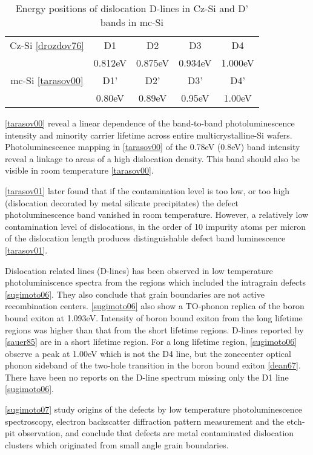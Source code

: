 \begin{table}[H]
\centering
\begin{tabular}{|c|c|c|c|c|}
\hline
Cz-Si \ref{drozdov76} & D1 & D2 & D3 & D4 \\
	& 0.812eV & 0.875eV & 0.934eV & 1.000eV \\
\hline
mc-Si \ref{tarasov00} & D1' & D2' & D3' & D4' \\
		& 0.80eV & 0.89eV & 0.95eV & 1.00eV \\
\hline
\end{tabular}
\caption{Energy positions of dislocation D-lines in Cz-Si and D' bands in mc-Si}
\label{}
\end{table}


\ref{tarasov00} reveal a linear dependence of the band-to-band photoluminescence intensity and minority carrier lifetime across entire multicrystalline-Si wafers. Photoluminescence mapping in \ref{tarasov00} of the 0.78eV (0.8eV) band intensity reveal a linkage to areas of a high dislocation density. This band should also be visible in room temperature \ref{tarasov00}.

\ref{tarasov01} later found that if the contamination level is too low, or too high (dislocation decorated by metal silicate precipitates) the defect photoluminescence band vanished in room temperature. However, a relatively low contamination level of dislocations, in the order of 10 impurity atoms per micron of the dislocation length produces distinguishable defect band luminescence \ref{tarasov01}. 

Dislocation related lines (D-lines) has been observed in low temperature photoluminiscence spectra from the regions which included the intragrain defects \ref{sugimoto06}. They also conclude that grain boundaries are not active recombination centers. \ref{sugimoto06} also show a TO-phonon replica of the boron bound exiton at 1.093eV. Intensity of boron bound exiton from the long lifetime regions was higher than that from the short lifetime regions. D-lines reported by \ref{sauer85} are in a short lifetime region. For a long lifetime region, \ref{sugimoto06} observe a peak at 1.00eV which is not the D4 line, but the zonecenter optical phonon sideband of the two-hole transition in the boron bound exiton \ref{dean67}. There have been no reports on the D-line spectrum missing only the D1 line \ref{sugimoto06}.


\ref{sugimoto07} study origins of the defects by low temperature photoluminescence spectroscopy, electron backscatter diffraction pattern measurement and the etch-pit observation, and conclude that defects are metal contaminated dislocation clusters which originated from small angle grain boundaries.






